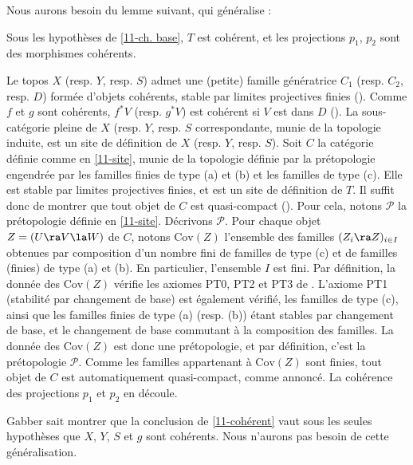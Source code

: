 \documentclass[10pt]{../fichiers-configuration-latex/smfart}
\begin{document}
Nous aurons besoin du lemme suivant, qui généralise \cite[9.1]{Cycles@Orgogozo} :

\begin{lemme}\label{11-cohérent} Sous les hypothèses de \ref{11-ch. base}, $T$ est cohérent, et les
projections $p_1$, $p_2$ sont des morphismes cohérents.
\end{lemme}

Le topos $X$ (resp. $Y$, resp. $S$) admet une (petite) famille génératrice $C_1$ (resp. $C_2$, resp.
$D$) formée d'objets cohérents, stable par limites projectives finies (). Comme $f$
et $g$ sont cohérents, $f^*V$ (resp. $g^*V$) est cohérent si $V$ est dans $D$ (). La
sous-catégorie pleine de $X$ (resp. $Y$, resp.  $S$ correspondante, munie de la topologie induite,
est un site de définition de $X$ (resp. $Y$, resp. $S$). Soit $C$ la catégorie définie comme en
\ref{11-site}, munie de la topologie définie par la prétopologie engendrée par les familles finies
de type (a) et (b) et les familles de type (c). Elle est stable par limites projectives finies, et
est un site de définition de $T$. Il suffit donc de montrer que tout objet de $C$ est quasi-compact
(). Pour cela, notons $\mathscr{P}$ la prétopologie définie en \ref{11-site}.
Décrivons $\mathscr{P}$. Pour chaque objet $Z = (U \ra V \la W)$ de $C$, notons $\mathrm{Cov}(Z)$
l'ensemble des familles $(Z_i \ra Z)_{i \in I}$ obtenues par composition d'un nombre fini de
familles de type (c) et de familles (finies) de type (a) et (b). En particulier, l'ensemble $I$ est
fini. Par définition, la donnée des $\mathrm{Cov}(Z)$ vérifie les axiomes PT0, PT2 et PT3 de
.  L'axiome PT1 (stabilité par changement de base) est également vérifié, les familles
de type (c), ainsi que les familles finies de type (a) (resp. (b)) étant stables par changement de
base, et le changement de base commutant à la composition des familles. La donnée des
$\mathrm{Cov}(Z)$ est donc une prétopologie, et par définition, c'est la prétopologie $\mathscr{P}$.
Comme les familles appartenant à $\mathrm{Cov}(Z)$ sont finies, tout objet de $C$ est
automatiquement quasi-compact, comme annoncé. La cohérence des projections $p_1$ et $p_2$ en
découle.


\begin{remarque}\label{11-g suffit} Gabber sait montrer que la conclusion de \ref{11-cohérent} vaut
sous les seules hypothèses que $X$, $Y$, $S$ et $g$ sont cohérents. Nous n'aurons pas besoin de
cette généralisation.
\end{remarque}
\end{document}
